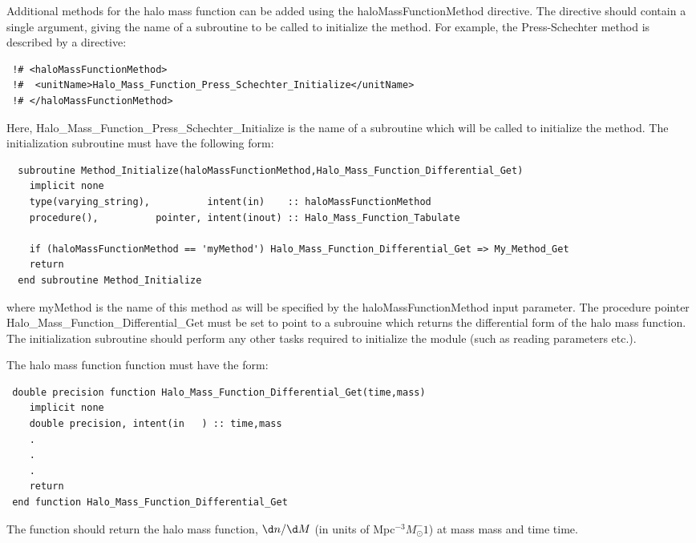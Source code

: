 Additional methods for the halo mass function can be added using the {\normalfont \ttfamily haloMassFunctionMethod} directive. The directive should contain a single argument, giving the name of a subroutine to be called to initialize the method. For example, the {\normalfont \ttfamily Press-Schechter} method is described by a directive:
\begin{verbatim}
 !# <haloMassFunctionMethod>
 !#  <unitName>Halo_Mass_Function_Press_Schechter_Initialize</unitName>
 !# </haloMassFunctionMethod>
\end{verbatim}
Here, {\normalfont \ttfamily Halo\_Mass\_Function\_Press\_Schechter\_Initialize} is the name of a subroutine which will be called to initialize the method. The initialization subroutine must have the following form:
\begin{verbatim}
  subroutine Method_Initialize(haloMassFunctionMethod,Halo_Mass_Function_Differential_Get)
    implicit none
    type(varying_string),          intent(in)    :: haloMassFunctionMethod
    procedure(),          pointer, intent(inout) :: Halo_Mass_Function_Tabulate
    
    if (haloMassFunctionMethod == 'myMethod') Halo_Mass_Function_Differential_Get => My_Method_Get
    return
  end subroutine Method_Initialize
\end{verbatim}
where {\normalfont \ttfamily myMethod} is the name of this method as will be specified by the {\normalfont \ttfamily haloMassFunctionMethod} input parameter. The procedure pointer {\normalfont \ttfamily Halo\_Mass\_Function\_Differential\_Get} must be set to point to a subrouine which returns the differential form of the halo mass function. The initialization subroutine should perform any other tasks required to initialize the module (such as reading parameters etc.).

The halo mass function function must have the form:
\begin{verbatim}
 double precision function Halo_Mass_Function_Differential_Get(time,mass)
    implicit none
    double precision, intent(in   ) :: time,mass
    .
    .
    .
    return
 end function Halo_Mass_Function_Differential_Get
\end{verbatim}
The function should return the halo mass function, $\d n/\d M$ (in units of Mpc$^{-3} M_\odot^-1$) at mass {\normalfont \ttfamily mass} and time {\normalfont \ttfamily time}.

